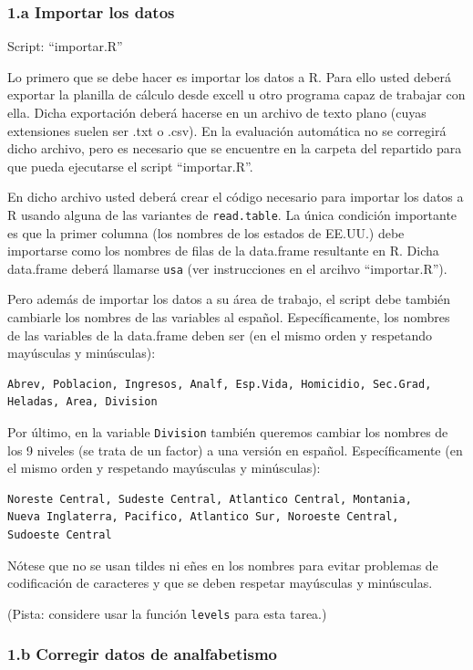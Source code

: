 \documentclass[]{article}
\begin{document}
\subsubsection{1.a Importar los datos}

Script: ``importar.R''

Lo primero que se debe hacer es importar los datos a R. Para ello usted
deberá exportar la planilla de cálculo desde excell u otro programa
capaz de trabajar con ella. Dicha exportación deberá hacerse en un
archivo de texto plano (cuyas extensiones suelen ser .txt o .csv). En la
evaluación automática no se corregirá dicho archivo, pero es necesario
que se encuentre en la carpeta del repartido para que pueda ejecutarse
el script ``importar.R''.

En dicho archivo usted deberá crear el código necesario para importar
los datos a R usando alguna de las variantes de \texttt{read.table}. La
única condición importante es que la primer columna (los nombres de los
estados de EE.UU.) debe importarse como los nombres de filas de la
data.frame resultante en R. Dicha data.frame deberá llamarse
\texttt{usa} (ver instrucciones en el arcihvo ``importar.R'').

Pero además de importar los datos a su área de trabajo, el script debe
también cambiarle los nombres de las variables al español.
Específicamente, los nombres de las variables de la data.frame deben ser
(en el mismo orden y respetando mayúsculas y minúsculas):

\begin{verbatim}
Abrev, Poblacion, Ingresos, Analf, Esp.Vida, Homicidio, Sec.Grad, 
Heladas, Area, Division
\end{verbatim}
Por último, en la variable \texttt{Division} también queremos cambiar
los nombres de los 9 niveles (se trata de un factor) a una versión en
español. Específicamente (en el mismo orden y respetando mayúsculas y minúsculas):

\begin{verbatim}
Noreste Central, Sudeste Central, Atlantico Central, Montania,
Nueva Inglaterra, Pacifico, Atlantico Sur, Noroeste Central,
Sudoeste Central
\end{verbatim}
Nótese que no se usan tildes ni eñes en los nombres para evitar
problemas de codificación de caracteres y que se deben respetar
mayúsculas y minúsculas.

(Pista: considere usar la función \texttt{levels} para esta tarea.)

\subsubsection{1.b Corregir datos de analfabetismo}
\end{document}
